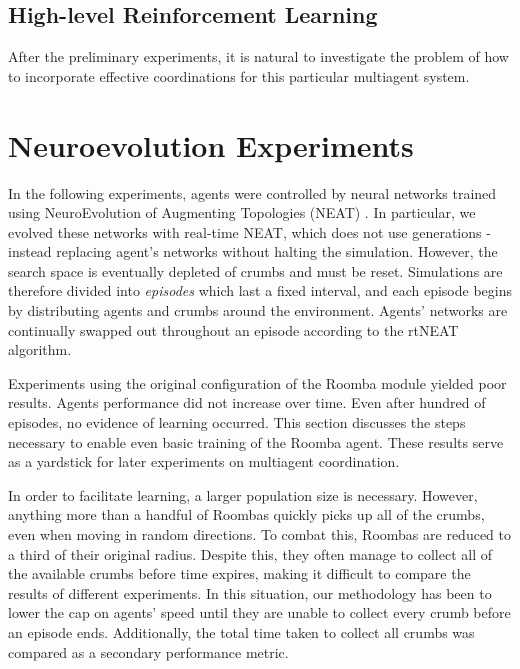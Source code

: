 \documentclass[conference]{IEEEtran}
\begin{document}
\subsection{High-level Reinforcement Learning}
After the preliminary experiments, it is natural to investigate the problem of how
to incorporate effective coordinations for this particular multiagent system.



\section{Neuroevolution Experiments}
\label{section:neuro}

In the following experiments, agents were controlled by neural networks
trained using NeuroEvolution of Augmenting Topologies (NEAT) \cite{stanley2002evolving}.
In particular, we evolved these networks with real-time NEAT, which does not use generations - instead replacing agent's networks without halting the simulation. However, the search space is eventually depleted of crumbs and must be reset. Simulations are therefore divided into \textit{episodes} which last a fixed interval, and  each episode begins by distributing agents and crumbs around the environment. Agents' networks are continually swapped out throughout an episode according to the rtNEAT algorithm.

Experiments using the original configuration of the Roomba module yielded poor results. Agents performance did not increase over time.  Even after hundred of episodes, no evidence of learning occurred. This section discusses the steps necessary to enable even basic training of the Roomba agent. These results serve as a yardstick for later experiments on multiagent coordination.

In order to facilitate learning, a larger population size is necessary. However, anything more than a handful of Roombas quickly picks up all of the crumbs, even when moving in random directions. To combat this, Roombas are reduced to a third of their original radius. Despite this, they often manage to collect 
all of the available crumbs before time expires, making it difficult to compare the results of different experiments. In this situation, our methodology has been to lower the cap on agents' speed until they are unable to collect every crumb before an episode ends. Additionally, the total time taken to collect all crumbs was compared as a secondary performance metric.
\end{document}
